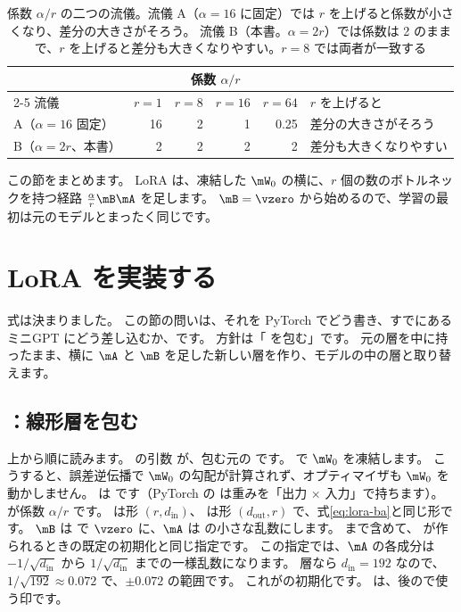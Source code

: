 \begin{table}[htbp]
\centering
\caption{係数 $\alpha/r$ の二つの流儀。流儀 A（$\alpha=16$ に固定）では $r$ を上げると係数が小さくなり、差分の大きさがそろう。
流儀 B（本書。$\alpha=2r$）では係数は 2 のままで、$r$ を上げると差分も大きくなりやすい。$r=8$ では両者が一致する}
\label{tab:lora-alpha}
\small
\begin{tabular}{lrrrrl}
\toprule
 & \multicolumn{4}{c}{係数 $\alpha/r$} & \\
\cmidrule(lr){2-5}
流儀 & $r=1$ & $r=8$ & $r=16$ & $r=64$ & $r$ を上げると \\
\midrule
A（$\alpha=16$ 固定） & 16 & 2 & 1 & 0.25 & 差分の大きさがそろう \\
B（$\alpha=2r$、本書） & 2 & 2 & 2 & 2 & 差分も大きくなりやすい \\
\bottomrule
\end{tabular}
\end{table}

この節をまとめます。
LoRA は、凍結した $\mW_0$ の横に、$r$ 個の数のボトルネックを持つ経路 $\frac{\alpha}{r}\mB\mA$ を足します。
$\mB=\vzero$ から始めるので、学習の最初は元のモデルとまったく同じです。

\section{LoRA を実装する}\label{sec:lora-impl}

式は決まりました。
この節の問いは、それを PyTorch でどう書き、すでにあるミニGPT にどう差し込むか、です。
方針は「 を包む」です。
元の層を中に持ったまま、横に $\mA$ と $\mB$ を足した新しい層を作り、モデルの中の層と取り替えます。

\subsection{：線形層を包む}\label{sec:lora-linear}


上から順に読みます。
 の引数  が、包む元の  です。
 で $\mW_0$ を凍結します。
こうすると、誤差逆伝播で $\mW_0$ の勾配が計算されず、オプティマイザも $\mW_0$ を動かしません。
 は  です（PyTorch の  は重みを「出力 × 入力」で持ちます）。
 が係数 $\alpha/r$ です。
 は形 $(r, d_{\text{in}})$、 は形 $(d_{\text{out}}, r)$ で、式\eqref{eq:lora-ba}と同じ形です。
$\mB$ は  で $\vzero$ に、$\mA$ は  の小さな乱数にします。
 まで含めて、 が作られるときの既定の初期化と同じ指定です。
この指定では、$\mA$ の各成分は $-1/\sqrt{d_{\text{in}}}$ から $1/\sqrt{d_{\text{in}}}$ までの一様乱数になります。
 層なら $d_{\text{in}}=192$ なので、$1/\sqrt{192}\approx0.072$ で、$\pm0.072$ の範囲です。
これがの初期化です。
 は、後ので使う印です。

